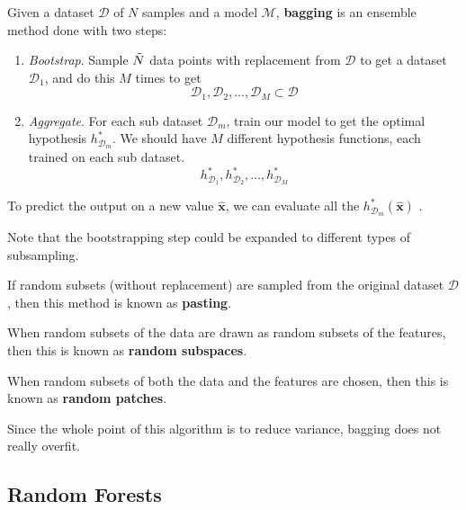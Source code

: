     \begin{definition}
      Given a dataset $\mathcal{D}$ of $N$ samples and a model $\mathcal{M}$, \textbf{bagging} is an ensemble method done with two steps: 
      \begin{enumerate}
        \item \textit{Bootstrap}. Sample $\Tilde{N}$ data points with replacement from $\mathcal{D}$ to get a dataset $\mathcal{D}_1$, and do this $M$ times to get 
        \[\mathcal{D}_1, \mathcal{D}_2, \ldots, \mathcal{D}_M \subset \mathcal{D}\]
        \item \textit{Aggregate}. For each sub dataset $\mathcal{D}_m$, train our model to get the optimal hypothesis $h_{\mathcal{D}_m}^\ast$. We should have $M$ different hypothesis functions, each trained on each sub dataset. 
        \[h_{\mathcal{D}_1}^\ast, h_{\mathcal{D}_2}^\ast, \ldots, h_{\mathcal{D}_M}^\ast\]
      \end{enumerate}
      To predict the output on a new value $\hat{\mathbf{x}}$, we can evaluate all the $h_{\mathcal{D}_m}^\ast (\hat{\mathbf{x}})$ .
    \end{definition}

    Note that the bootstrapping step could be expanded to different types of subsampling. 

    \begin{definition}[Pasting]
      If random subsets (without replacement) are sampled from the original dataset $\mathcal{D}$, then this method is known as \textbf{pasting}. 
    \end{definition}

    \begin{definition}
      When random subsets of the data are drawn as random subsets of the features, then this is known as \textbf{random subspaces}. 
    \end{definition}

    \begin{definition}
      When random subsets of both the data and the features are chosen, then this is known as \textbf{random patches}. 
    \end{definition}

    Since the whole point of this algorithm is to reduce variance, bagging does not really overfit. 

    \subsection{Random Forests}

